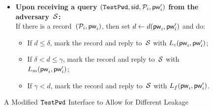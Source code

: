 
\begin{figure}[tb]
  \centering
  \begin{fboxenv}
    \begin{minipage}{0.95\textwidth}
      \begin{itemize}
      \item
        \textbf{Upon receiving a query
        $(\texttt{TestPwd},\mathsf{sid},\mathcal{P}_{i},\mathsf{pw}_{i}')$ from the adversary~$\mathcal{S}$:} \\
        If there is a  record~$(\mathcal{P}_{i},\mathsf{pw}_{i})$, then set $d\gets d(\mathsf{pw}_{i},\mathsf{pw}_{i}')$ and do:
        \begin{itemize}
        	  \item If $d \leq \delta$, mark the record  and reply to~$\mathcal{S}$ with $L_{c}(\mathsf{pw}_{i}, \mathsf{pw}_{i}')$;
	  \item If $\delta < d \leq \gamma$, mark the record  and reply to~$\mathcal{S}$ with $L_{m}(\mathsf{pw}_{i}, \mathsf{pw}_{i}')$;
          \item If $\gamma < d$, mark the record  and reply to~$\mathcal{S}$ with $L_{f}(\mathsf{pw}_{i}, \mathsf{pw}_{i}')$.
        \end{itemize}
      \end{itemize}
    \end{minipage}
  \end{fboxenv}
  \caption{A Modified $\texttt{TestPwd}$ Interface to Allow for Different Leakage}
  \label{fig:func-UC-FAKE-testpwd}
\end{figure}

